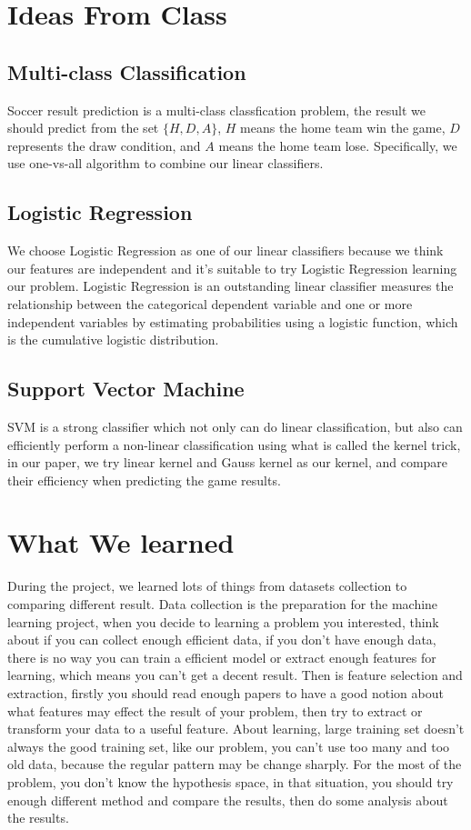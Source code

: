 \documentclass[conference,11pt]{article}
\begin{document}
\section{Ideas From Class}

\subsection{Multi-class Classification}
Soccer result prediction is a multi-class classfication problem, the result we should predict from the set $\{H,D,A\}$, $H$ means the home team win the game, $D$ represents the draw condition, and $A$ means the home team lose. Specifically, we use one-vs-all algorithm to combine our linear classifiers.
\subsection{Logistic Regression}
We choose Logistic Regression as one of our linear classifiers because we think our features are independent and it's suitable to try Logistic Regression learning our problem. Logistic Regression is an outstanding linear classifier measures the relationship between the categorical dependent variable and one or more independent variables by estimating probabilities using a logistic function, which is the cumulative logistic distribution. 
\subsection{Support Vector Machine}
SVM is a strong classifier which not only can do linear classification, but also can efficiently perform a non-linear classification using what is called the kernel trick, in our paper, we try linear kernel and Gauss kernel as our kernel, and compare their efficiency when predicting the game results.

\section{What We learned}
During the project, we learned lots of things from datasets collection to comparing different result. Data collection is the preparation for the machine learning project, when you decide to learning a problem you interested, think about if you can collect enough efficient data, if you don't have enough data, there is no way you can train a efficient model or extract enough features for learning, which means you can't get a decent result. Then is feature selection and extraction, firstly you should read enough papers to have a good notion about what features may effect the result of your problem, then try to extract or transform your data to a useful feature. About learning, large training set doesn't always the good training set, like our problem, you can't use too many and too old data, because the regular pattern may be change sharply. For the most of the problem, you don't know the hypothesis space, in that situation, you should try enough different method and compare the results, then do some analysis about the results.
\end{document}

